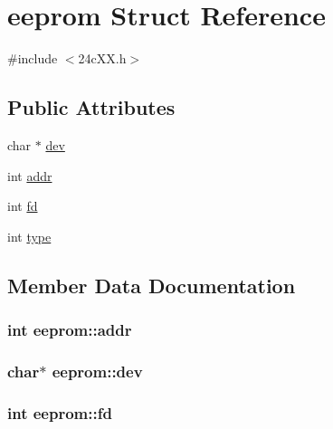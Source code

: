 \hypertarget{structeeprom}{}\section{eeprom Struct Reference}
\label{structeeprom}


{\ttfamily \#include $<$24c\+X\+X.\+h$>$}

\subsection*{Public Attributes}
\begin{DoxyCompactItemize}
\item 
char $\ast$ \hyperlink{structeeprom_a2135e064ebccafef56883d4b4069ad7b}{dev}
\item 
int \hyperlink{structeeprom_ab2374ddbc958324828fa96e73beb69c8}{addr}
\item 
int \hyperlink{structeeprom_ab78e4dde9793c5e732b4b7035cf776d5}{fd}
\item 
int \hyperlink{structeeprom_a5f7af6dd1fae82c8077974e8cca136e3}{type}
\end{DoxyCompactItemize}


\subsection{Member Data Documentation}
\hypertarget{structeeprom_ab2374ddbc958324828fa96e73beb69c8}{}
\subsubsection[{addr}]{\setlength{\rightskip}{0pt plus 5cm}int eeprom\+::addr}\label{structeeprom_ab2374ddbc958324828fa96e73beb69c8}
\hypertarget{structeeprom_a2135e064ebccafef56883d4b4069ad7b}{}
\subsubsection[{dev}]{\setlength{\rightskip}{0pt plus 5cm}char$\ast$ eeprom\+::dev}\label{structeeprom_a2135e064ebccafef56883d4b4069ad7b}
\hypertarget{structeeprom_ab78e4dde9793c5e732b4b7035cf776d5}{}
\subsubsection[{fd}]{\setlength{\rightskip}{0pt plus 5cm}int eeprom\+::fd}\label{structeeprom_ab78e4dde9793c5e732b4b7035cf776d5}
\hypertarget{structeeprom_a5f7af6dd1fae82c8077974e8cca136e3}{}
